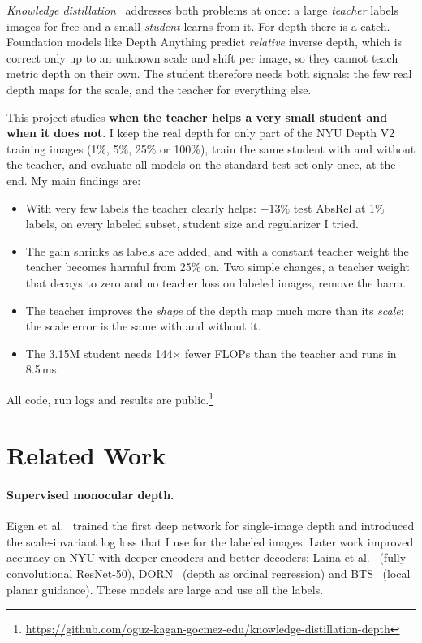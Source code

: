 \documentclass[11pt]{article}
\begin{document}
\emph{Knowledge distillation}~\cite{hinton2015} addresses both problems at once: a large
\emph{teacher} labels images for free and a small \emph{student} learns from it. For depth there
is a catch. Foundation models like Depth Anything predict \emph{relative} inverse depth, which is
correct only up to an unknown scale and shift per image, so they cannot teach metric depth on
their own. The student therefore needs both signals: the few real depth maps for the scale, and
the teacher for everything else.

This project studies \textbf{when the teacher helps a very small student and when it does not}.
I keep the real depth for only part of the NYU Depth V2~\cite{silberman2012} training images
(1\%, 5\%, 25\% or 100\%), train the same student with and without the teacher, and evaluate all
models on the standard test set only once, at the end. My main findings are:
\begin{itemize}
  \item With very few labels the teacher clearly helps: $-13\%$ test AbsRel at 1\% labels, on
        every labeled subset, student size and regularizer I tried.
  \item The gain shrinks as labels are added, and with a constant teacher weight the teacher
        becomes harmful from 25\% on. Two simple changes, a teacher weight that decays to zero
        and no teacher loss on labeled images, remove the harm.
  \item The teacher improves the \emph{shape} of the depth map much more than its \emph{scale};
        the scale error is the same with and without it.
  \item The 3.15M student needs 144$\times$ fewer FLOPs than the teacher and runs in 8.5\,ms.
\end{itemize}
All code, run logs and results are public.\footnote{\url{https://github.com/oguz-kagan-gocmez-edu/knowledge-distillation-depth}}

\section{Related Work}

\paragraph{Supervised monocular depth.} Eigen et al.~\cite{eigen2014} trained the first deep
network for single-image depth and introduced the scale-invariant log loss that I use for the
labeled images. Later work improved accuracy on NYU with deeper encoders and better decoders:
Laina et al.~\cite{laina2016} (fully convolutional ResNet-50), DORN~\cite{fu2018} (depth as
ordinal regression) and BTS~\cite{lee2019} (local planar guidance). These models are large and use
all the labels.
\end{document}
